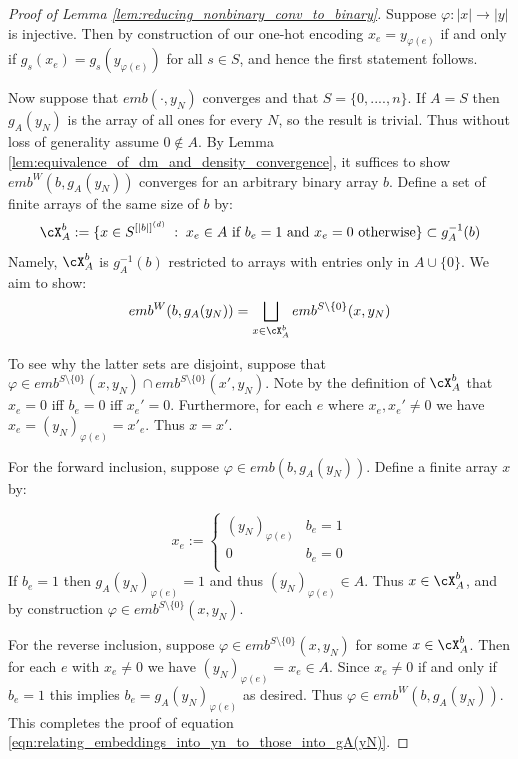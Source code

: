 \documentclass[11pt,oneside,reqno]{article}
\theoremstyle{plain}
\theoremstyle{definition}
\numberwithin{equation}{section}
\renewcommand{\phi}{\varphi}
\begin{document}
\begin{proof}[Proof of Lemma \ref{lem:reducing_nonbinary_conv_to_binary}]
    
    Suppose $\phi:|x| \to |y|$ is injective. Then by construction of our one-hot encoding $x_e = y_{\phi(e)}$ if and only if $g_s(x_e) = g_s(y_{\phi(e)})$ for all $s \in S$, and hence the first statement follows. 
    
     Now suppose that $emb(\cdot, y_N)$ converges and that $S = \{0,...., n\}$. If $A = S$ then $g_A(y_N)$ is the array of all ones for every $N$, so the result is trivial. Thus without loss of generality assume $0 \notin A$. By Lemma \ref{lem:equivalence_of_dm_and_density_convergence}, it suffices to show $emb^W(b, g_A(y_N))$ converges for an arbitrary binary array $b$. Define a set of finite arrays of the same size of $b$ by:
    \[\cX^b_A := \{x \in S^{[|b|]^{(d)}} \; : \; x_e \in A \text{ if } b_e = 1 \text{ and } x_e = 0 \text{ otherwise}\} \subset g_A^{-1}(b)\]
    Namely, $\cX^b_A$ is $g_A^{-1}(b)$ restricted to arrays with entries only in $A \cup \{0\}$. We aim to show:
    \begin{equation}
        emb^W(b, g_A(y_N)) = \bigsqcup_{x \in \cX^b_A} emb^{S \setminus \{0\}}(x, y_N)
        \label{eqn:relating_embeddings_into_yn_to_those_into_gA(yN)}
    \end{equation}
    
    To see why the latter sets are disjoint, suppose that $\phi \in emb^{S \setminus \{0\}}(x, y_N) \cap emb^{S \setminus \{0\}}(x', y_N)$. Note by the definition of $\cX^b_A$ that $x_e = 0$ iff $b_e=0$ iff $x_e' = 0$. Furthermore, for each $e$ where $x_e,x_e' \neq 0$ we have $x_e = (y_N)_{\phi(e)} = x'_e$. Thus $x = x'$. 
    
    For the forward inclusion, suppose $\phi \in emb(b, g_A(y_N))$. Define a finite array $x$ by:

    \[x_e := \begin{cases}
        (y_N)_{\phi(e)} & b_e = 1 \\
        0 & b_e = 0 \\
    \end{cases}\]
    \noindent If $b_e = 1$ then $g_A(y_N)_{\phi(e)} = 1$ and thus $(y_N)_{\phi(e)} \in A$. Thus $x \in \cX^b_A$, and by construction $\phi \in emb^{S \setminus \{0\}}(x,y_N)$. 

    For the reverse inclusion, suppose $\phi \in emb^{S \setminus \{0\}}(x,y_N)$ for some $x \in \cX^b_A$. Then for each $e$ with $x_e \neq 0$ we have $(y_N)_{\phi(e)} = x_e \in A$.  Since $x_e \neq 0$ if and only if $b_e = 1$ this implies $b_e = g_A(y_N)_{\phi(e)}$ as desired. Thus $\phi \in emb^W(b, g_A(y_N))$. This completes the proof of equation \eqref{eqn:relating_embeddings_into_yn_to_those_into_gA(yN)}. 
    

\end{proof}
\end{document}
